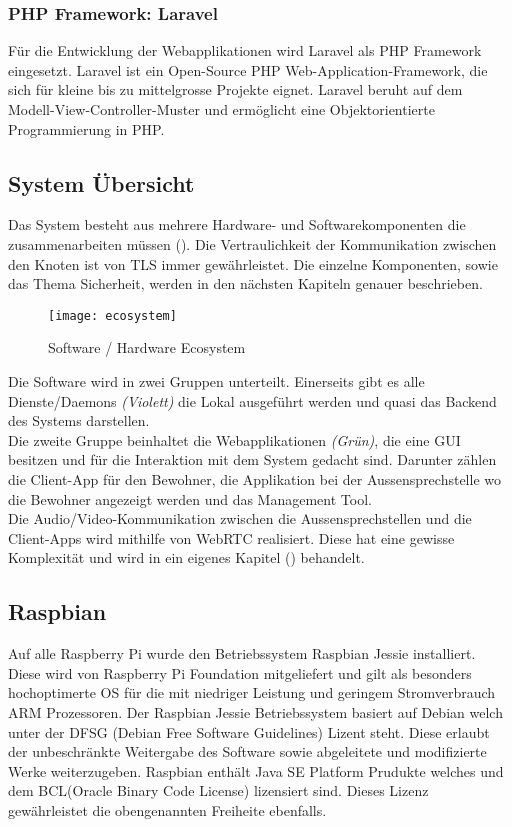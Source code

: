 \subsubsection{PHP Framework: Laravel}
Für die Entwicklung der Webapplikationen wird Laravel als PHP Framework eingesetzt. Laravel ist ein Open-Source PHP Web-Application-Framework, die sich für kleine bis zu mittelgrosse Projekte eignet. Laravel beruht auf dem Modell-View-Controller-Muster und ermöglicht eine Objektorientierte Programmierung in PHP.

\subsection{System Übersicht}
Das System besteht aus mehrere Hardware- und Softwarekomponenten die zusammenarbeiten müssen (). Die  Vertraulichkeit der Kommunikation zwischen den Knoten ist von TLS immer gewährleistet. Die einzelne Komponenten, sowie das Thema Sicherheit, werden in den nächsten Kapiteln genauer beschrieben.

\begin{figure}[htb!]
	\begin{center}
		\texttt{[image: ecosystem]}
		\caption[Software / Hardware Ecosystem]{Software / Hardware Ecosystem}
		\label{fig:echosystem}
	\end{center}
\end{figure}

Die Software wird in zwei Gruppen unterteilt. Einerseits gibt es alle Dienste/Daemons \textit{(Violett)} die Lokal ausgeführt werden und quasi das Backend des Systems darstellen.
\\
Die zweite Gruppe beinhaltet die Webapplikationen \textit{(Grün)}, die eine GUI besitzen und für die Interaktion mit dem System gedacht sind. Darunter zählen die Client-App für den Bewohner, die Applikation bei der Aussensprechstelle wo die Bewohner angezeigt werden und das Management Tool.
\\
Die Audio/Video-Kommunikation zwischen die Aussensprechstellen und die Client-Apps wird mithilfe von WebRTC realisiert. Diese hat eine gewisse Komplexität und wird in ein eigenes Kapitel () behandelt.

\subsection{Raspbian}
\label{kap:raspbian}
Auf alle Raspberry Pi wurde den Betriebssystem Raspbian Jessie installiert. Diese wird von Raspberry Pi Foundation mitgeliefert und gilt als besonders hochoptimerte OS für die mit niedriger Leistung und geringem Stromverbrauch ARM Prozessoren.
Der Raspbian Jessie Betriebssystem basiert auf Debian welch unter der DFSG (Debian Free Software Guidelines) Lizent steht. Diese erlaubt der unbeschränkte Weitergabe des Software sowie abgeleitete und modifizierte  Werke weiterzugeben. 
Raspbian enthält Java SE Platform Prudukte welches und dem BCL(Oracle Binary Code License) lizensiert sind. Dieses Lizenz gewährleistet die obengenannten Freiheite ebenfalls.

